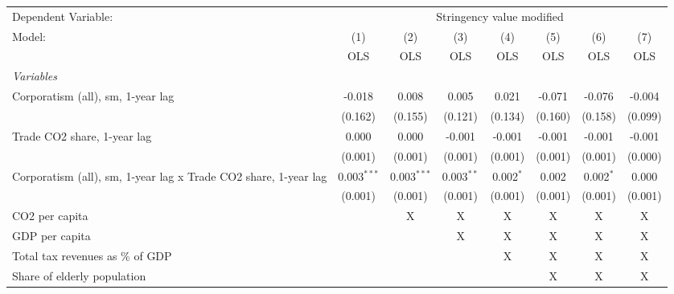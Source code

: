 
\begingroup
\centering
\begin{tabular}{lccccccc}
   \toprule
   Dependent Variable: & \multicolumn{7}{c}{Stringency value modified}\\
   Model:                                                          & (1)           & (2)           & (3)          & (4)         & (5)     & (6)         & (7)\\  
                                                                   &  OLS          & OLS           & OLS          & OLS         & OLS     & OLS         & OLS\\  
   \midrule
   \emph{Variables}\\
   Corporatism (all), sm, 1-year lag                               & -0.018        & 0.008         & 0.005        & 0.021       & -0.071  & -0.076      & -0.004\\   
                                                                   & (0.162)       & (0.155)       & (0.121)      & (0.134)     & (0.160) & (0.158)     & (0.099)\\   
   Trade CO2 share, 1-year lag                                     & 0.000         & 0.000         & -0.001       & -0.001      & -0.001  & -0.001      & -0.001\\   
                                                                   & (0.001)       & (0.001)       & (0.001)      & (0.001)     & (0.001) & (0.001)     & (0.000)\\   
   Corporatism (all), sm, 1-year lag x Trade CO2 share, 1-year lag & 0.003$^{***}$ & 0.003$^{***}$ & 0.003$^{**}$ & 0.002$^{*}$ & 0.002   & 0.002$^{*}$ & 0.000\\   
                                                                   & (0.001)       & (0.001)       & (0.001)      & (0.001)     & (0.001) & (0.001)     & (0.001)\\   
   CO2 per capita                                                  &               & X             & X            & X           & X       & X           & X\\  
   GDP per capita                                                  &               &               & X            & X           & X       & X           & X\\  
   Total tax revenues as \% of GDP                                 &               &               &              & X           & X       & X           & X\\  
   Share of elderly population                                     &               &               &              &             & X       & X           & X\\  

\end{tabular}
